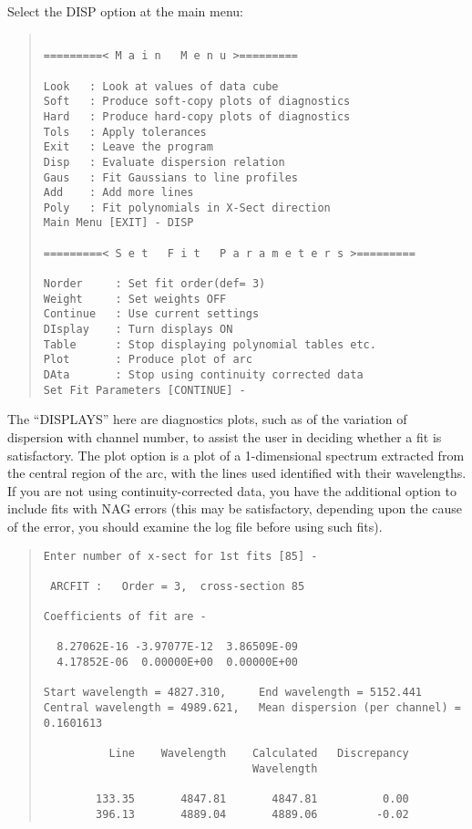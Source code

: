 Select the DISP option at the main menu:
\begin{quote}\begin{verbatim}
 
=========< M a i n   M e n u >=========
 
Look   : Look at values of data cube
Soft   : Produce soft-copy plots of diagnostics
Hard   : Produce hard-copy plots of diagnostics
Tols   : Apply tolerances
Exit   : Leave the program
Disp   : Evaluate dispersion relation
Gaus   : Fit Gaussians to line profiles
Add    : Add more lines
Poly   : Fit polynomials in X-Sect direction
Main Menu [EXIT] - DISP

=========< S e t   F i t   P a r a m e t e r s >=========

Norder     : Set fit order(def= 3)
Weight     : Set weights OFF
Continue   : Use current settings
DIsplay    : Turn displays ON
Table      : Stop displaying polynomial tables etc.
Plot       : Produce plot of arc
DAta       : Stop using continuity corrected data
Set Fit Parameters [CONTINUE] -
\end{verbatim}\end{quote}
The ``DISPLAYS'' here are diagnostics plots, such as of the variation
of dispersion with channel number, to assist the user in deciding
whether a fit is satisfactory.
The plot option is a plot of a 1-dimensional spectrum extracted from
the central region of the arc, with the lines used identified with their
wavelengths.
If you are not using continuity-corrected data, you have the additional
option to include fits with NAG errors (this may be satisfactory,
depending upon the cause of the error, you should examine the log file
before using such fits).
\begin{quote}\begin{verbatim}
Enter number of x-sect for 1st fits [85] -
 
 ARCFIT :   Order = 3,  cross-section 85
 
Coefficients of fit are -

  8.27062E-16 -3.97077E-12  3.86509E-09
  4.17852E-06  0.00000E+00  0.00000E+00

Start wavelength = 4827.310,     End wavelength = 5152.441
Central wavelength = 4989.621,   Mean dispersion (per channel) = 0.1601613

          Line    Wavelength    Calculated   Discrepancy
                                Wavelength

        133.35       4847.81       4847.81          0.00
        396.13       4889.04       4889.06         -0.02
\end{verbatim}\end{quote}
